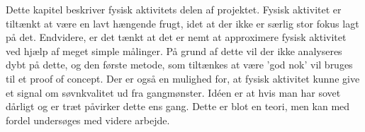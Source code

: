 Dette kapitel beskriver fysisk aktivitets delen af projektet.
Fysisk aktivitet er tiltænkt at være en lavt hængende frugt, idet at der ikke er særlig stor fokus lagt på det.
Endvidere, er det tænkt at det er nemt at approximere fysisk aktivitet ved hjælp af meget simple målinger.
På grund af dette vil der ikke analyseres dybt på dette, og den første metode, som tiltænkes at være 'god nok' vil bruges til et proof of concept.
Der er også en mulighed for, at fysisk aktivitet kunne give et signal om søvnkvalitet ud fra gangmønster.
Idéen er at hvis man har sovet dårligt og er træt påvirker dette ens gang.
Dette er blot en teori, men kan med fordel undersøges med videre arbejde.